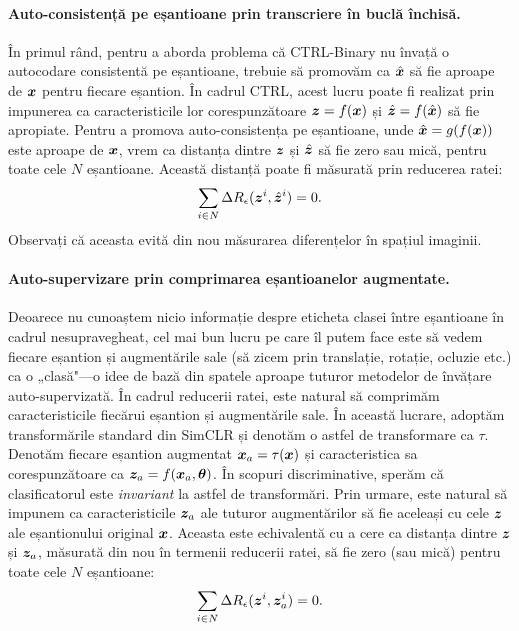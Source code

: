 \documentclass[../../book-main_ro.tex]{subfiles}
\begin{document}
\paragraph{Auto-consistență pe eșantioane prin transcriere în buclă închisă.}
În primul rând, pentru a aborda problema că CTRL-Binary nu învață o autocodare consistentă pe eșantioane, trebuie să promovăm ca $\hat {\bm{x}}$ să fie aproape de $\bm{x}$ pentru fiecare eșantion. În cadrul CTRL, acest lucru poate fi realizat prin impunerea ca caracteristicile lor corespunzătoare $\bm{z}=f(\bm{x})$ și $\hat {\bm{z}} = f(\hat {\bm{x}})$ să fie apropiate.
Pentru a promova auto-consistența pe eșantioane, unde $\hat{\bm{x}} = g(f(\bm{x}))$ este aproape de $\bm{x}$, vrem ca distanța dintre $\bm{z}$ și $\hat{\bm{z}}$ să fie zero sau mică, pentru toate cele $N$ eșantioane.
Această distanță poate fi măsurată prin reducerea ratei:
\begin{align}
\sum_{i\in N} \Delta R_\epsilon(\z^i,\hat{\z}^i) = 0.
\label{eqn:sample-self-consistency}\vspace{-2mm}
\end{align}
Observați că aceasta evită din nou măsurarea diferențelor în spațiul imaginii.

\paragraph{Auto-supervizare prin comprimarea eșantioanelor augmentate.}
Deoarece nu cunoaștem nicio informație despre eticheta clasei între eșantioane în cadrul nesupravegheat, cel mai bun lucru pe care îl putem face este să vedem fiecare eșantion și augmentările sale (să zicem prin translație, rotație, ocluzie etc.) ca o „clasă"—o idee de bază din spatele aproape tuturor metodelor de învățare auto-supervizată. În cadrul reducerii ratei, este natural să comprimăm caracteristicile fiecărui eșantion și augmentările sale. În această lucrare, adoptăm transformările standard din SimCLR \cite{chen2020simple} și denotăm o astfel de transformare ca $\tau$. Denotăm fiecare eșantion augmentat $\bm{x}_a = \tau(\bm{x})$ și caracteristica sa corespunzătoare ca $\bm{z}_a = f(\bm{x}_a, \bm \theta) $. În scopuri discriminative, sperăm că clasificatorul este {\em invariant} la astfel de transformări. Prin urmare, este natural să impunem ca caracteristicile $\bm{z}_a$ ale tuturor augmentărilor să fie aceleași cu cele $\bm{z}$ ale eșantionului original $\bm{x}$. Aceasta este echivalentă cu a cere ca distanța dintre $\bm{z}$ și $\bm{z}_a$, măsurată din nou în termenii reducerii ratei, să fie zero (sau mică) pentru toate cele $N$ eșantioane:
\begin{align}
\sum_{i\in N} \Delta R_\epsilon(\z^i,\z_{a}^i) = 0.
\label{eqn:sample-compression}\vspace{-3mm}
\end{align}
\end{document}
